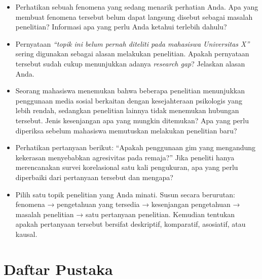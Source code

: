 \documentclass[
  indonesian,
  letterpaper,
  DIV=11,
  numbers=noendperiod]{scrreprt}
\providecommand{\tightlist}{%
  \setlength{\itemsep}{0pt}\setlength{\parskip}{0pt}}
\begin{document}
\begin{tcolorbox}[enhanced jigsaw, colframe=quarto-callout-important-color-frame, toptitle=1mm, breakable, leftrule=.75mm, arc=.35mm, toprule=.15mm, colback=white, colbacktitle=quarto-callout-important-color!10!white, bottomtitle=1mm, bottomrule=.15mm, titlerule=0mm, title=\textcolor{quarto-callout-important-color}{\faExclamation}\hspace{0.5em}{Refleksi \& Diskusi}, coltitle=black, left=2mm, opacitybacktitle=0.6, opacityback=0, rightrule=.15mm]

\begin{itemize}
\tightlist
\item
  Perhatikan sebuah fenomena yang sedang menarik perhatian Anda. Apa
  yang membuat fenomena tersebut belum dapat langsung disebut sebagai
  masalah penelitian? Informasi apa yang perlu Anda ketahui terlebih
  dahulu?
\item
  Pernyataan \emph{``topik ini belum pernah diteliti pada mahasiswa
  Universitas X''} sering digunakan sebagai alasan melakukan penelitian.
  Apakah pernyataan tersebut sudah cukup menunjukkan adanya
  \emph{research gap}? Jelaskan alasan Anda.
\item
  Seorang mahasiswa menemukan bahwa beberapa penelitian menunjukkan
  penggunaan media sosial berkaitan dengan kesejahteraan psikologis yang
  lebih rendah, sedangkan penelitian lainnya tidak menemukan hubungan
  tersebut. Jenis kesenjangan apa yang mungkin ditemukan? Apa yang perlu
  diperiksa sebelum mahasiswa memutuskan melakukan penelitian baru?
\item
  Perhatikan pertanyaan berikut: ``Apakah penggunaan gim yang mengandung
  kekerasan menyebabkan agresivitas pada remaja?'' Jika peneliti hanya
  merencanakan survei korelasional satu kali pengukuran, apa yang perlu
  diperbaiki dari pertanyaan tersebut dan mengapa?
\item
  Pilih satu topik penelitian yang Anda minati. Susun secara berurutan:
  fenomena → pengetahuan yang tersedia → kesenjangan pengetahuan →
  masalah penelitian → satu pertanyaan penelitian. Kemudian tentukan
  apakah pertanyaan tersebut bersifat deskriptif, komparatif, asosiatif,
  atau kausal.
\end{itemize}

\end{tcolorbox}

\section*{Daftar Pustaka}\label{daftar-pustaka}
\end{document}
